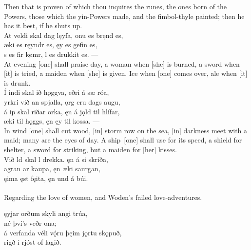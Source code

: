 \bvb Then that is proven of which thou inquires the runes, the ones born of the Powers, those which the yin-Powers made, and the fimbol-thyle painted; then he has it best, if he shuts up. \\

\bva At veldi skal dag lęyfa, \hld {}onu es bręnd es, \\%
æki es ręyndr es, \hld {}ęy es gefin es, \\%
s es fir kømr, \hld {}l es drukkit es. —\\%

\bvb At evening [one] shall praise day, a woman when [she] is burned, a sword when [it] is tried, a maiden when [she] is given. Ice when [one] comes over, ale when [it] is drunk. \\

\bva Í indi skal ið hǫggva, \hld {}eðri á sæ róa, \\%
yrkri við an spjalla, \hld {}ǫrg eru dags augu, \\%
á ip skal riðar orka, \hld ęn á jǫld til hlífar, \\%
æki til hǫggs, \hld ęn ęy til kossa. —\\%

\bvb In wind [one] shall cut wood, [in] storm row on the sea, [in] darkness meet with a maid; many are the eyes of day. A ship [one] shall use for its speed, a shield for shelter, a sword for striking, but a maiden for [her] kisses. \\

\bva Við ld skal l drekka. \hld ęn á si skríða, \\%
agran ar kaupa, \hld ęn æki saurgan, \\%
ęima ęst fęita, \hld ęn und á búi. \\%

 \\

	Regarding the love of women, and Woden's failed love-adventures.

\bva {}ęyjar orðum \hld skyli angi trúa, \\%
\ind né því's veðr ona; \\%
á verfanda véli \hld vǫ́ru þęim jǫrtu skǫpuð, \\%
\ind {}rigð í rjóst of lagið\footnotemark[29]. \\%

